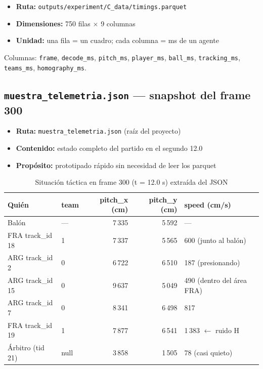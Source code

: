 \documentclass[11pt,a4paper]{article}
\begin{document}
\begin{itemize}[noitemsep]
  \item \textbf{Ruta:} \texttt{outputs/experiment/C\_data/timings.parquet}
  \item \textbf{Dimensiones:} 750 filas $\times$ 9 columnas
  \item \textbf{Unidad:} una fila = un cuadro; cada columna = ms de un agente
\end{itemize}

Columnas: \texttt{frame}, \texttt{decode\_ms}, \texttt{pitch\_ms},
\texttt{player\_ms}, \texttt{ball\_ms}, \texttt{tracking\_ms},
\texttt{teams\_ms}, \texttt{homography\_ms}.

\subsection{\texttt{muestra\_telemetria.json} — snapshot del frame 300}

\begin{itemize}[noitemsep]
  \item \textbf{Ruta:} \texttt{muestra\_telemetria.json} (raíz del proyecto)
  \item \textbf{Contenido:} estado completo del partido en el segundo 12.0
  \item \textbf{Propósito:} prototipado rápido sin necesidad de leer los parquet
\end{itemize}

\begin{table}[H]
\centering
\caption{Situación táctica en frame 300 (t = 12.0 s) extraída del JSON}
\label{tab:snapshot}
\begin{tabular}{llrrl}
\toprule
\textbf{Quién} & \textbf{team} & \textbf{pitch\_x (cm)} & \textbf{pitch\_y (cm)} & \textbf{speed (cm/s)} \\
\midrule
Balón              & —   & 7\,335 & 5\,592 & — \\
FRA track\_id 18   & 1   & 7\,337 & 5\,565 & 600 (junto al balón) \\
ARG track\_id 2    & 0   & 6\,722 & 6\,510 & 187 (presionando) \\
ARG track\_id 15   & 0   & 9\,637 & 5\,049 & 490 (dentro del área FRA) \\
ARG track\_id 7    & 0   & 8\,341 & 6\,498 & 817 \\
FRA track\_id 19   & 1   & 7\,877 & 6\,541 & 1\,383 \textcolor{rojoacento}{$\leftarrow$ ruido H} \\
Árbitro (tid 21)   & null & 3\,858 & 1\,505 & 78 (casi quieto) \\
\bottomrule
\end{tabular}
\end{table}
\end{document}
